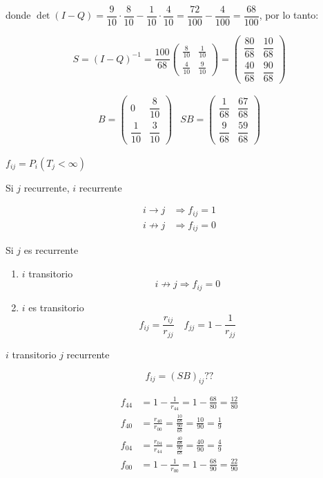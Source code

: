 donde $\det(I-Q) = \dfrac{9}{10}\cdot\dfrac{8}{10} - \dfrac{1}{10}\cdot\dfrac{4}{10} = \dfrac{72}{100} - \dfrac{4}{100} = \dfrac{68}{100}$, por lo tanto:

\[
S = (I-Q)^{-1} = \frac{100}{68}
\begin{pmatrix}
  \tfrac{8}{10} & \tfrac{1}{10} \\[4pt]
  \tfrac{4}{10} & \tfrac{9}{10}
\end{pmatrix}
=
\begin{pmatrix}
  \dfrac{80}{68} & \dfrac{10}{68} \\[8pt]
  \dfrac{40}{68} & \dfrac{90}{68}
\end{pmatrix}
\]

\[
    \begin{array}{cc}
    B = \begin{pmatrix} 0&\dfrac{8}{10}\\ \dfrac{1}{10}&\dfrac{3}{10} \end{pmatrix} & 
    SB = \begin{pmatrix} \dfrac{1}{68}&\dfrac{67}{68}\\\dfrac{9}{68}&\dfrac{59}{68} \end{pmatrix}
    \end{array}
\]

$f_{ij} = P_{i}(T_{j} < \infty)$

Si $j$ recurrente, $i$ recurrente

\begin{align*}
    i \to j &\Rightarrow f_{ij} = 1 \\
    i \not\to j &\Rightarrow f_{ij} = 0
\end{align*}

Si $j$ es recurrente 
\begin{enumerate}
    \item $i$ transitorio
    \[
    i \not \to j \Rightarrow f_{ij} = 0
    \]
    \item $i$ es transitorio 
    \[
    f_{ij} = \dfrac{r_{ij}}{r_{jj}} \quad f_{jj} = 1 -\dfrac{1}{r_{jj}}
    \]
\end{enumerate}

$i$ transitorio $j$ recurrente

\[
f_{ij} = (SB)_{ij} ??
\]

\begin{align*}
    f_{44} &= 1 - \frac{1}{r_{44}} = 1 - \frac{68}{80} = \frac{12}{80} \\[6pt]
    f_{40} &= \frac{r_{40}}{r_{00}} = \frac{\tfrac{10}{68}}{\tfrac{90}{68}} = \frac{10}{90} = \frac{1}{9} \\[6pt]
    f_{04} &= \frac{r_{04}}{r_{44}} = \frac{\tfrac{40}{68}}{\tfrac{90}{68}} = \frac{40}{90} = \frac{4}{9} \\[6pt]
    f_{00} &= 1 - \frac{1}{r_{00}} = 1 - \frac{68}{90} = \frac{22}{90}
\end{align*}

